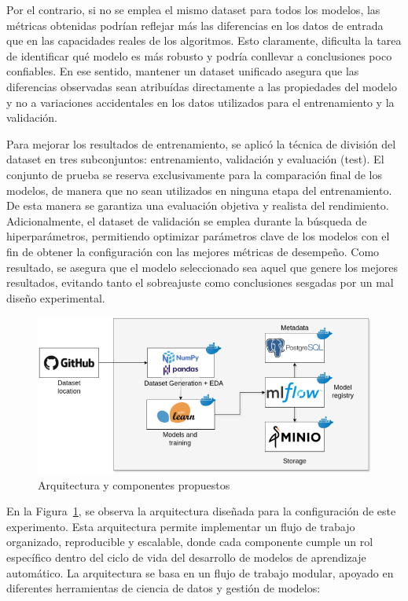 \documentclass[11pt,a4paper,spanish]{book}
\numberwithin{equation}{chapter}
\numberwithin{figure}{chapter}
\begin{document}
Por el contrario, si no se emplea el mismo dataset para todos los modelos, las métricas obtenidas podrían reflejar más las diferencias en los datos de entrada que en las capacidades reales de los algoritmos. Esto claramente, dificulta la tarea de identificar qué modelo es más robusto y podría conllevar a conclusiones poco confiables. En ese sentido, mantener un dataset unificado asegura que las diferencias observadas sean atribuídas directamente a las propiedades del modelo y no a variaciones accidentales en los datos utilizados para el entrenamiento y la validación.


Para mejorar los resultados de entrenamiento, se aplicó la técnica de división del dataset en tres subconjuntos: entrenamiento, validación y evaluación (test). El conjunto de prueba se reserva exclusivamente para la comparación final de los modelos, de manera que no sean utilizados en ninguna etapa del entrenamiento. De esta manera se garantiza una evaluación objetiva y realista del rendimiento. 
Adicionalmente, el dataset de validación se emplea durante la búsqueda de hiperparámetros, permitiendo optimizar parámetros clave de los modelos con el fin de obtener la configuración con las mejores métricas de desempeño. Como resultado, se asegura que el modelo seleccionado sea aquel que genere los mejores resultados, evitando tanto el sobreajuste como conclusiones sesgadas por un mal diseño experimental.

\begin{figure}[h]
    \centering
    \includegraphics[width=1\textwidth]{media/arquitecura.png}
    \caption{Arquitectura y componentes propuestos  }
    \label{fig:figArchitecture}
\end{figure}

En la Figura~\ref{fig:figArchitecture}, se observa la arquitectura diseñada para la configuración de este experimento. Esta arquitectura permite implementar un flujo de trabajo organizado, reproducible y escalable, donde cada componente cumple un rol específico dentro del ciclo de vida del desarrollo de modelos de aprendizaje automático. La arquitectura se basa en un flujo de trabajo modular, apoyado en diferentes herramientas de ciencia de datos y gestión de modelos:
\end{document}
